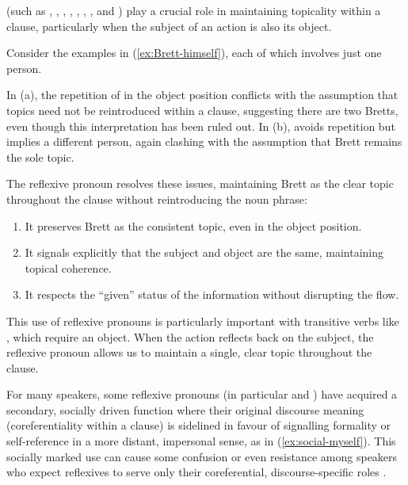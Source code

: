 \label{ex:did-so}
\z
{}

 (such as , , , , , , , and ) play a crucial role in maintaining topicality within a clause, particularly when the subject of an action is also its object.

Consider the examples in (\ref{ex:Brett-himself}), each of which involves just one person.

\ea\label{ex:Brett-himself}
\z
\z
In (a), the repetition of  in the object position conflicts with the assumption that topics need not be reintroduced within a clause, suggesting there are two Bretts, even though this interpretation has been ruled out. In (b),  avoids repetition but implies a different person, again clashing with the assumption that Brett remains the sole topic.

The reflexive pronoun  resolves these issues, maintaining Brett as the clear topic throughout the clause without reintroducing the noun phrase:

\begin{enumerate}[noitemsep]
    \item It preserves Brett as the consistent topic, even in the object position.
    \item It signals explicitly that the subject and object are the same, maintaining topical coherence.
    \item It respects the \enquote{given} status of the information without disrupting the flow.
\end{enumerate}

This use of reflexive pronouns is particularly important with transitive verbs like , which require an object. When the action reflects back on the subject, the reflexive pronoun allows us to maintain a single, clear topic throughout the clause.

For many speakers, some reflexive pronouns (in particular  and ) have acquired a secondary, socially driven function where their original discourse meaning (coreferentiality within a clause) is sidelined in favour of signalling formality or self-reference in a more distant, impersonal sense, as in (\ref{ex:social-myself}). This socially marked use can cause some confusion or even resistance among speakers who expect reflexives to serve only their coreferential, discourse-specific roles \citep{Gilman1989}.


